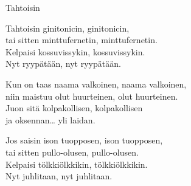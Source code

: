 \begin{song}{Tahtoisin}
	
	
	
	Tahtoisin ginitonicin, ginitonicin,\\
	tai sitten minttufernetin, minttufernetin.\\
	Kelpaisi kossuvissykin, kossuvissykin.\\
	Nyt ryypätään, nyt ryypätään.
	
	Kun on taas naama valkoinen, naama valkoinen,\\
	niin maistuu olut huurteinen, olut huurteinen.\\
	Juon sitä kolpakollisen, kolpakollisen\\
	ja oksennan\ldots{} yli laidan.
	
	Jos saisin ison tuopposen, ison tuopposen,\\
	tai sitten pullo-olusen, pullo-olusen.\\
	Kelpaisi tölkkiölkkikin, tölkkiölkkikin.\\
	Nyt juhlitaan, nyt juhlitaan.
	
\end{song}
